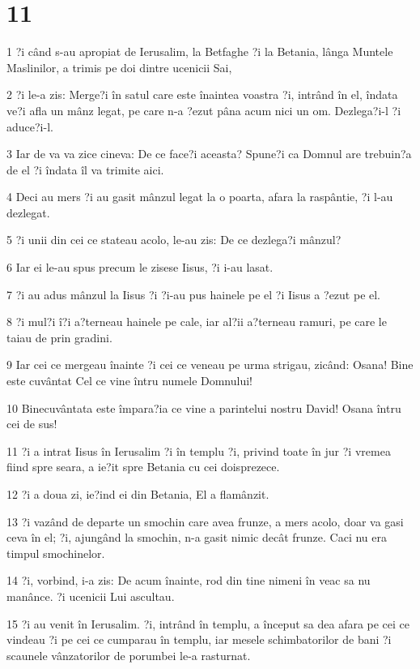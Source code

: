 \chapter{11}

\par 1 ?i când s-au apropiat de Ierusalim, la Betfaghe ?i la Betania, lânga Muntele Maslinilor, a trimis pe doi dintre ucenicii Sai,
\par 2 ?i le-a zis: Merge?i în satul care este înaintea voastra ?i, intrând în el, îndata ve?i afla un mânz legat, pe care n-a ?ezut pâna acum nici un om. Dezlega?i-l ?i aduce?i-l.
\par 3 Iar de va va zice cineva: De ce face?i aceasta? Spune?i ca Domnul are trebuin?a de el ?i îndata îl va trimite aici.
\par 4 Deci au mers ?i au gasit mânzul legat la o poarta, afara la raspântie, ?i l-au dezlegat.
\par 5 ?i unii din cei ce stateau acolo, le-au zis: De ce dezlega?i mânzul?
\par 6 Iar ei le-au spus precum le zisese Iisus, ?i i-au lasat.
\par 7 ?i au adus mânzul la Iisus ?i ?i-au pus hainele pe el ?i Iisus a ?ezut pe el.
\par 8 ?i mul?i î?i a?terneau hainele pe cale, iar al?ii a?terneau ramuri, pe care le taiau de prin gradini.
\par 9 Iar cei ce mergeau înainte ?i cei ce veneau pe urma strigau, zicând: Osana! Bine este cuvântat Cel ce vine întru numele Domnului!
\par 10 Binecuvântata este împara?ia ce vine a parintelui nostru David! Osana întru cei de sus!
\par 11 ?i a intrat Iisus în Ierusalim ?i în templu ?i, privind toate în jur ?i vremea fiind spre seara, a ie?it spre Betania cu cei doisprezece.
\par 12 ?i a doua zi, ie?ind ei din Betania, El a flamânzit.
\par 13 ?i vazând de departe un smochin care avea frunze, a mers acolo, doar va gasi ceva în el; ?i, ajungând la smochin, n-a gasit nimic decât frunze. Caci nu era timpul smochinelor.
\par 14 ?i, vorbind, i-a zis: De acum înainte, rod din tine nimeni în veac sa nu manânce. ?i ucenicii Lui ascultau.
\par 15 ?i au venit în Ierusalim. ?i, intrând în templu, a început sa dea afara pe cei ce vindeau ?i pe cei ce cumparau în templu, iar mesele schimbatorilor de bani ?i scaunele vânzatorilor de porumbei le-a rasturnat.
